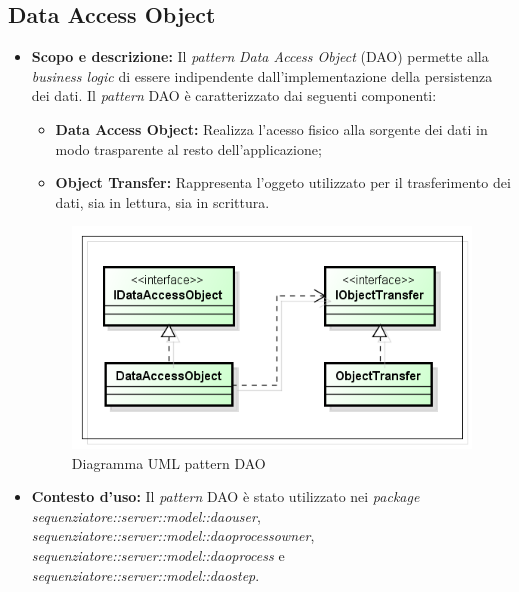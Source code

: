 \subsection{Data Access Object}
\begin{itemize}
\item \textbf{Scopo e descrizione:}
Il \textit{pattern} \textit{Data Access Object} (DAO) permette alla \textit{business logic} di essere indipendente dall'implementazione della persistenza dei dati.
Il \textit{pattern} DAO è caratterizzato dai seguenti componenti:
\begin{itemize}
\item \textbf{Data Access Object:}
Realizza l'acesso fisico alla sorgente dei dati in modo trasparente al resto dell'applicazione;
\item \textbf{Object Transfer:}
Rappresenta l'oggeto utilizzato per il trasferimento dei dati, sia in lettura, sia in scrittura.
\end{itemize}
\begin{figure}[H] \centering \includegraphics[scale=1]{./pattern/dao.png} \caption{Diagramma UML pattern DAO}
\end{figure}
\item \textbf{Contesto d'uso:}
Il \textit{pattern} DAO è stato utilizzato nei \textit{package sequenziatore::server::model::daouser}, \textit{sequenziatore::server::model::daoprocessowner}, \textit{sequenziatore::server::model::daoprocess} e \textit{sequenziatore::server::model::daostep}. 
\end{itemize}

